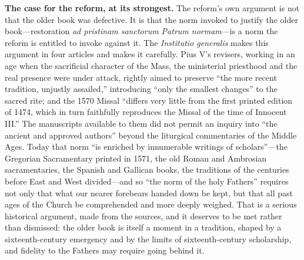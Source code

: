 \textbf{The case for the reform, at its strongest.} The reform's own argument is not that the older book was defective. It is that the norm invoked to justify the older book---restoration \emph{ad pristinam sanctorum Patrum normam}---is a norm the reform is entitled to invoke against it. The \emph{Institutio generalis} makes this argument in four articles and makes it carefully. Pius V's revisers, working in an age when the sacrificial character of the Mass, the ministerial priesthood and the real presence were under attack, rightly aimed to preserve ``the more recent tradition, unjustly assailed,'' introducing ``only the smallest changes'' to the sacred rite; and the 1570 Missal ``differs very little from the first printed edition of 1474, which in turn faithfully reproduces the Missal of the time of Innocent III.'' The manuscripts available to them did not permit an inquiry into ``the ancient and approved authors'' beyond the liturgical commentaries of the Middle Ages. Today that norm ``is enriched by innumerable writings of scholars''---the Gregorian Sacramentary printed in 1571, the old Roman and Ambrosian sacramentaries, the Spanish and Gallican books, the traditions of the centuries before East and West divided---and so ``the norm of the holy Fathers'' requires not only that what our nearer forebears handed down be kept, but that all past ages of the Church be comprehended and more deeply weighed. That is a serious historical argument, made from the sources, and it deserves to be met rather than dismissed: the older book is itself a moment in a tradition, shaped by a sixteenth-century emergency and by the limits of sixteenth-century scholarship, and fidelity to the Fathers may require going behind it.

